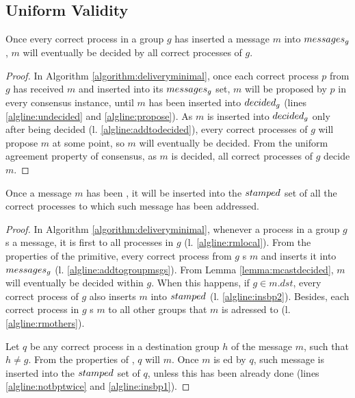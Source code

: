 \documentclass[times, 10pt]{article}
\begin{document}
\subsection{Uniform Validity}




\begin{lems} \label{lemma:mcastdecided}
Once every correct process in a group $g$ has inserted a message $m$ into $messages\text{$_g$}$, $m$ will eventually be decided by all correct processes of $g$.
\end{lems}

\begin{proof}
In Algorithm \ref{algorithm:deliveryminimal}, once each correct process $p$ from $g$ has received $m$ and inserted into its $messages\text{$_g$}$ set, $m$ will be proposed by $p$ in every consensus instance, until $m$ has been inserted into $decided\text{$_g$}$ (lines \ref{algline:undecided} and \ref{algline:propose}). As $m$ is inserted into $decided\text{$_g$}$ only after being decided (l. \ref{algline:addtodecided}), every correct processes of $g$ will propose $m$ at some point, so $m$ will eventually be decided. From the uniform agreement property of consensus, as $m$ is decided, all correct processes of $g$ decide $m$.
\end{proof}







\begin{lems} \label{lemma:mcastbarpending}
Once a message $m$ has been \amcast{}, it will be inserted into the $stamped$ set of all the correct processes to which such message has been addressed.
\end{lems}

\begin{proof}
In Algorithm \ref{algorithm:deliveryminimal}, whenever a process in a group $g$ \amcast{}s a message, it is first \rmcast{} to all processes in $g$ (l. \ref{algline:rmlocal}). From the properties of the \rmcast{} primitive, every correct process from $g$ \rmdel{}s $m$ and inserts it into $messages\text{$_g$}$ (l. \ref{algline:addtogroupmsgs}). From Lemma \ref{lemma:mcastdecided}, $m$ will eventually be decided within $g$. When this happens, if $g \in m.dst$, every correct process of $g$ also inserts $m$ into $stamped$ (l. \ref{algline:insbp2}). Besides, each correct process in $g$ \rmcast{}s $m$ to all other groups that $m$ is adressed to (l. \ref{algline:rmothers}).

Let $q$ be any correct process in a destination group $h$ of the message $m$, such that $h \neq g$. From the properties of \rmcast{}, $q$ will \rmdel{} $m$. Once $m$ is \rmdel{}ed by $q$, such message is inserted into the $stamped$ set of $q$, unless this has been already done (lines \ref{algline:notbptwice} and \ref{algline:insbp1}).
\end{proof}
\end{document}
